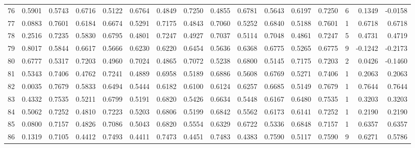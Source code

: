 \begin{tabular}{lrrrrrrrrrrrrrrr}
76  &      0.5901 &  0.5743 &  0.6716 &  0.5122 &  0.6764 &  0.4849 &  0.7250 &  0.4855 &  0.6781 &  0.5643 &   0.6197 &     0.7250 &      6 &                    0.1349 &                    -0.0158 \\
77  &      0.0883 &  0.7601 &  0.6184 &  0.6674 &  0.5291 &  0.7175 &  0.4843 &  0.7060 &  0.5252 &  0.6840 &   0.5188 &     0.7601 &      1 &                    0.6718 &                     0.6718 \\
78  &      0.2516 &  0.7235 &  0.5830 &  0.6795 &  0.4801 &  0.7247 &  0.4927 &  0.7037 &  0.5114 &  0.7048 &   0.4861 &     0.7247 &      5 &                    0.4731 &                     0.4719 \\
79  &      0.8017 &  0.5844 &  0.6617 &  0.5666 &  0.6230 &  0.6220 &  0.6454 &  0.5636 &  0.6368 &  0.6775 &   0.5265 &     0.6775 &      9 &                   -0.1242 &                    -0.2173 \\
80  &      0.6777 &  0.5317 &  0.7203 &  0.4960 &  0.7024 &  0.4865 &  0.7072 &  0.5238 &  0.6800 &  0.5145 &   0.7175 &     0.7203 &      2 &                    0.0426 &                    -0.1460 \\
81  &      0.5343 &  0.7406 &  0.4762 &  0.7241 &  0.4889 &  0.6958 &  0.5189 &  0.6886 &  0.5608 &  0.6769 &   0.5271 &     0.7406 &      1 &                    0.2063 &                     0.2063 \\
82  &      0.0035 &  0.7679 &  0.5833 &  0.6494 &  0.5444 &  0.6182 &  0.6100 &  0.6124 &  0.6257 &  0.6685 &   0.5149 &     0.7679 &      1 &                    0.7644 &                     0.7644 \\
83  &      0.4332 &  0.7535 &  0.5211 &  0.6799 &  0.5191 &  0.6820 &  0.5426 &  0.6634 &  0.5448 &  0.6167 &   0.6480 &     0.7535 &      1 &                    0.3203 &                     0.3203 \\
84  &      0.5062 &  0.7252 &  0.4810 &  0.7223 &  0.5203 &  0.6806 &  0.5199 &  0.6842 &  0.5562 &  0.6173 &   0.6141 &     0.7252 &      1 &                    0.2190 &                     0.2190 \\
85  &      0.0800 &  0.7157 &  0.4826 &  0.7086 &  0.5043 &  0.6820 &  0.5554 &  0.6329 &  0.6722 &  0.5336 &   0.6848 &     0.7157 &      1 &                    0.6357 &                     0.6357 \\
86  &      0.1319 &  0.7105 &  0.4412 &  0.7493 &  0.4411 &  0.7473 &  0.4451 &  0.7483 &  0.4383 &  0.7590 &   0.5117 &     0.7590 &      9 &                    0.6271 &                     0.5786 \\

\end{tabular}

